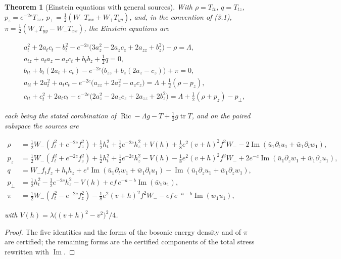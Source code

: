 \documentclass[11pt]{article}
\newtheorem{theorem}{Theorem}[section]
\theoremstyle{remark}
\begin{document}
\begin{theorem}[Einstein equations with general sources]
\label{thm:v20v24-einstein}
With \(\rho=T_{tt}\), \(q=T_{tz}\), \(p_z=e^{-2c}T_{zz}\),
\(p_\perp=\tfrac12(W_-T_{xx}+W_+T_{yy})\), and, in the convention of
(3.1), \(\pi=\tfrac12(W_+T_{yy}-W_-T_{xx})\), the Einstein equations are

\[
\begin{aligned}
 &a_t^2+2a_tc_t-b_t^2-e^{-2c}\bigl(3a_z^2-2a_zc_z+2a_{zz}+b_z^2\bigr)-\rho=\Lambda,\\
 &a_{tz}+a_ta_z-a_zc_t+b_tb_z+\tfrac12q=0,\\
 &b_{tt}+b_t(2a_t+c_t)-e^{-2c}\bigl(b_{zz}+b_z(2a_z-c_z)\bigr)+\pi=0,\\
 &a_{tt}+2a_t^2+a_tc_t-e^{-2c}\bigl(a_{zz}+2a_z^2-a_zc_z\bigr)=\Lambda+\tfrac12(\rho-p_z),\\
 &c_{tt}+c_t^2+2a_tc_t-e^{-2c}\bigl(2a_z^2-2a_zc_z+2a_{zz}+2b_z^2\bigr)=\Lambda+\tfrac12(\rho+p_z)-p_\perp,
\end{aligned}                                                          \tag{27.2}
\]

each being the stated combination of
\(\operatorname{Ric}-\Lambda g-T+\tfrac12g\operatorname{tr}T\), and on the
paired subspace the sources are

\[
\begin{aligned}
 \rho&=\tfrac12W_-(f_t^2+e^{-2c}f_z^2)+\tfrac12h_t^2+\tfrac12e^{-2c}h_z^2+V(h)+\tfrac18e^2(v+h)^2f^2W_-
 -2\operatorname{Im}(\bar u_1\partial_tu_1+\bar w_1\partial_tw_1),\\
 p_z&=\tfrac12W_-(f_t^2+e^{-2c}f_z^2)+\tfrac12h_t^2+\tfrac12e^{-2c}h_z^2-V(h)-\tfrac18e^2(v+h)^2f^2W_-
 +2e^{-c}\operatorname{Im}(\bar u_1\partial_zw_1+\bar w_1\partial_zu_1),\\
 q&=W_-f_tf_z+h_th_z+e^{c}\operatorname{Im}(\bar u_1\partial_tw_1+\bar w_1\partial_tu_1)
 -\operatorname{Im}(\bar u_1\partial_zu_1+\bar w_1\partial_zw_1),\\
 p_\perp&=\tfrac12h_t^2-\tfrac12e^{-2c}h_z^2-V(h)+ef\,e^{-a-b}\operatorname{Im}(\bar w_1u_1),\\
 \pi&=\tfrac12W_-(f_t^2-e^{-2c}f_z^2)-\tfrac18e^2(v+h)^2f^2W_--ef\,e^{-a-b}\operatorname{Im}(\bar w_1u_1),
\end{aligned}                                                          \tag{27.3}
\]

with \(V(h)=\lambda\bigl((v+h)^2-v^2\bigr)^2/4\).
\end{theorem}

\begin{proof}
The five identities and the forms of the bosonic energy density and
of \(\pi\) are certified; the remaining forms are the certified
components of the total stress rewritten with
\(\operatorname{Im}\).
\end{proof}
\end{document}

